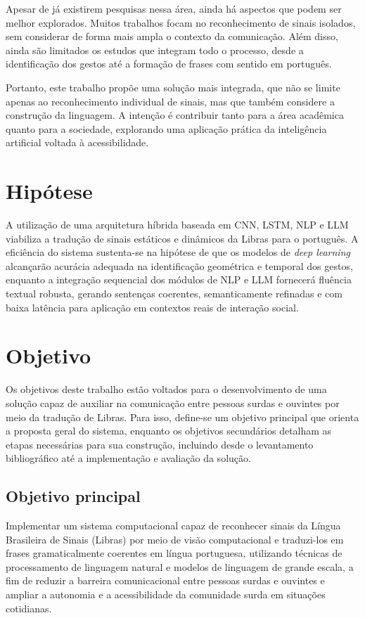 \documentclass[
    12pt,                %
    openright,           %
    oneside,             %
    a4paper,             %
    english,             %
    brazil               %
]{abntex2}
\begin{document}
Apesar de já existirem pesquisas nessa área, ainda há aspectos que podem ser melhor explorados. Muitos trabalhos focam no reconhecimento de sinais isolados, sem considerar de forma mais ampla o contexto da comunicação. Além disso, ainda são limitados os estudos que integram todo o processo, desde a identificação dos gestos até a formação de frases com sentido em português.

Portanto, este trabalho propõe uma solução mais integrada, que não se limite apenas ao reconhecimento individual de sinais, mas que também considere a construção da linguagem. A intenção é contribuir tanto para a área acadêmica quanto para a sociedade, explorando uma aplicação prática da inteligência artificial voltada à acessibilidade.

\section{Hipótese}
\label{sec:hipotese}

A utilização de uma arquitetura híbrida baseada em CNN, LSTM, NLP e LLM viabiliza a tradução de sinais estáticos e dinâmicos da Libras para o português. A eficiência do sistema sustenta-se na hipótese de que os modelos de \textit{deep learning} alcançarão acurácia adequada na identificação geométrica e temporal dos gestos, enquanto a integração sequencial dos módulos de NLP e LLM fornecerá fluência textual robusta, gerando sentenças coerentes, semanticamente refinadas e com baixa latência para aplicação em contextos reais de interação social.

\section{Objetivo}
\label{sec:objetivo}

Os objetivos deste trabalho estão voltados para o desenvolvimento de uma solução capaz de auxiliar na comunicação entre pessoas surdas e ouvintes por meio da tradução de Libras. Para isso, define-se um objetivo principal que orienta a proposta geral do sistema, enquanto os objetivos secundários detalham as etapas necessárias para sua construção, incluindo desde o levantamento bibliográfico até a implementação e avaliação da solução.

\subsection{Objetivo principal}
Implementar um sistema computacional capaz de reconhecer sinais da Língua Brasileira de Sinais (Libras) por meio de visão computacional e traduzi-los em frases gramaticalmente coerentes em língua portuguesa, utilizando técnicas de processamento de linguagem natural e modelos de linguagem de grande escala, a fim de reduzir a barreira comunicacional entre pessoas surdas e ouvintes e ampliar a autonomia e a acessibilidade da comunidade surda em situações cotidianas.
\end{document}
